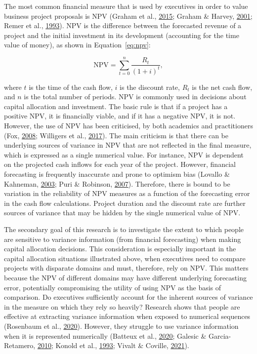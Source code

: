 \documentclass[
  english,
  man, donotrepeattitle,floatsintext]{apa7}
\theoremstyle{definition}
\theoremstyle{definition}
\theoremstyle{definition}
\theoremstyle{definition}
\theoremstyle{remark}
\begin{document}
The most common financial measure that is used by executives in order to value
business project proposals is NPV (Graham et al., \protect\hyperlink{ref-graham2015}{2015}; Graham \& Harvey, \protect\hyperlink{ref-graham2001}{2001}; Remer et al., \protect\hyperlink{ref-remer1993}{1993}). NPV is
the difference between the forecasted revenue of a project and the initial
investment in its development (accounting for the time value of money), as shown
in Equation~\eqref{eq:npv}:

\begin{equation}
\text{NPV}=\sum_{t=0}^n \frac{R_t}{(1+i)^t}, \label{eq:npv}
\end{equation}

where \(t\) is the time of the cash flow, \(i\) is the discount rate, \(R_t\) is the
net cash flow, and \(n\) is the total number of periods. NPV is commonly used in
decisions about capital allocation and investment. The basic rule is that if a
project has a positive NPV, it is financially viable, and if it has a negative
NPV, it is not. However, the use of NPV has been criticised, by both academics
and practitioners (Fox, \protect\hyperlink{ref-fox2008}{2008}; Willigers et al., \protect\hyperlink{ref-willigers2017}{2017}). The main criticism is that there
can be underlying sources of variance in NPV that are not reflected in the final
measure, which is expressed as a single numerical value. For instance, NPV is
dependent on the projected cash inflows for each year of the project. However,
financial forecasting is frequently inaccurate and prone to optimism bias
(Lovallo \& Kahneman, \protect\hyperlink{ref-lovallo2003}{2003}; Puri \& Robinson, \protect\hyperlink{ref-puri2007}{2007}). Therefore, there is bound to be variation in the
reliability of NPV measures as a function of the forecasting error in the cash
flow calculations. Project duration and the discount rate are further sources of
variance that may be hidden by the single numerical value of NPV.

The secondary goal of this research is to investigate the extent to which people
are sensitive to variance information (from financial forecasting) when making
capital allocation decisions. This consideration is especially important in the
capital allocation situations illustrated above, when executives need to compare
projects with disparate domains and must, therefore, rely on NPV. This matters
because the NPV of different domains may have different underlying forecasting
error, potentially compromising the utility of using NPV as the basis of
comparison. Do executives sufficiently account for the inherent sources of
variance in the measure on which they rely so heavily? Research shows that
people are effective at extracting variance information when exposed to
numerical sequences (Rosenbaum et al., \protect\hyperlink{ref-rosenbaum2020}{2020}). However, they struggle to use variance
information when it is represented numerically (Batteux et al., \protect\hyperlink{ref-batteux2020}{2020}; Galesic \& Garcia-Retamero, \protect\hyperlink{ref-galesic2010}{2010}; Konold et al., \protect\hyperlink{ref-konold1993}{1993}; Vivalt \& Coville, \protect\hyperlink{ref-vivalt2021}{2021}).
\end{document}
